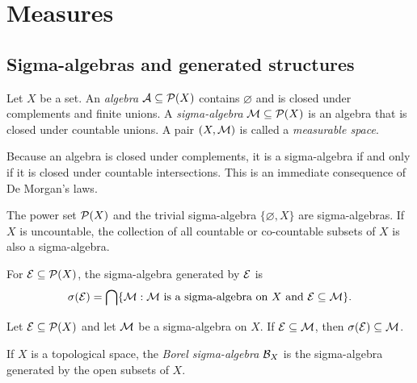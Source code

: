 \chapter{Measures}

\section{Sigma-algebras and generated structures}

\begin{de}
Let $X$ be a set. An \emph{algebra} $\mathcal{A}\subseteq\mathcal{P}(X)$ contains $\varnothing$ and is closed under complements and finite unions. A \emph{sigma-algebra} $\mathcal{M}\subseteq\mathcal{P}(X)$ is an algebra that is closed under countable unions. A pair $(X,\mathcal{M})$ is called a \emph{measurable space}.
\end{de}

\begin{remark}
Because an algebra is closed under complements, it is a sigma-algebra if and only if it is closed under countable intersections. This is an immediate consequence of De Morgan's laws.
\end{remark}

\begin{eg}
The power set $\mathcal{P}(X)$ and the trivial sigma-algebra $\{\varnothing,X\}$ are sigma-algebras. If $X$ is uncountable, the collection of all countable or co-countable subsets of $X$ is also a sigma-algebra.
\end{eg}

\begin{de}
For $\mathcal{E}\subseteq\mathcal{P}(X)$, the sigma-algebra generated by $\mathcal{E}$ is
\[
\sigma(\mathcal{E})=\bigcap\{\mathcal{M}:\mathcal{M}\text{ is a sigma-algebra on }X\text{ and }\mathcal{E}\subseteq\mathcal{M}\}.
\]
\end{de}

\begin{lem}
Let $\mathcal{E}\subseteq\mathcal{P}(X)$ and let $\mathcal{M}$ be a sigma-algebra on $X$. If $\mathcal{E}\subseteq\mathcal{M}$, then $\sigma(\mathcal{E})\subseteq\mathcal{M}$.
\end{lem}

\begin{de}
If $X$ is a topological space, the \emph{Borel sigma-algebra} $\mathcal{B}_X$ is the sigma-algebra generated by the open subsets of $X$.
\end{de}

